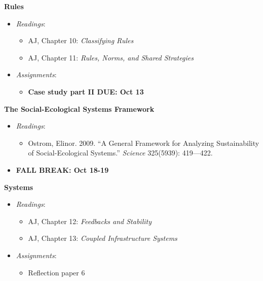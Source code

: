 \week \textbf{Rules}

\begin{itemize}

\item
  \emph{Readings}:

  \begin{itemize}
  
  \item
    AJ, Chapter 10: \emph{Classifying Rules}
  \item
    AJ, Chapter 11: \emph{Rules, Norms, and Shared Strategies}
  \end{itemize}
\item
  \emph{Assignments}:

  \begin{itemize}
  
  \item
    \textbf{Case study part II DUE: Oct 13}
  \end{itemize}
\end{itemize}

\week \textbf{The Social-Ecological Systems Framework}

\begin{itemize}

\item
  \emph{Readings}:

  \begin{itemize}
  
  \item
    Ostrom, Elinor. 2009. ``A General Framework for Analyzing
    Sustainability of Social-Ecological Systems.'' \emph{Science}
    325(5939): 419---422.
  \end{itemize}
\item
  \textbf{FALL BREAK: Oct 18-19}
\end{itemize}

\week \textbf{Systems}

\begin{itemize}

\item
  \emph{Readings}:

  \begin{itemize}
  
  \item
    AJ, Chapter 12: \emph{Feedbacks and Stability}
  \item
    AJ, Chapter 13: \emph{Coupled Infrastructure Systems}
  \end{itemize}
\item
  \emph{Assignments}:

  \begin{itemize}
  
  \item
    Reflection paper 6
  \end{itemize}
\end{itemize}

